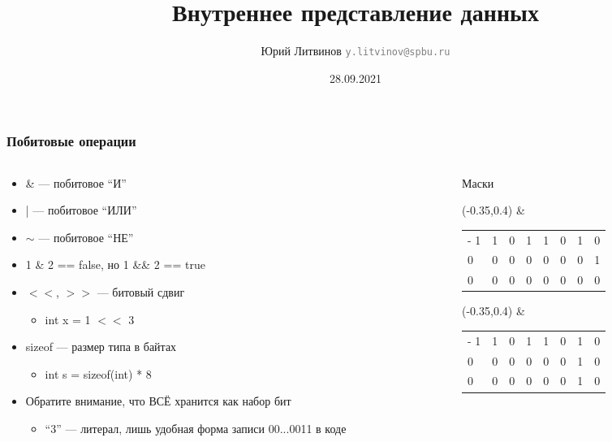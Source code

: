 \documentclass[xetex,mathserif,serif]{beamer}
\title{Внутреннее представление данных}
\author[Юрий Литвинов]{Юрий Литвинов \newline \textcolor{gray}{\small\texttt{y.litvinov@spbu.ru}}}
\date{28.09.2021}
\begin{document}
	
	\frame{\titlepage}
	
	\begin{frame}
		\frametitle{Побитовые операции}
		\begin{columns}
			\begin{column}{0.6\textwidth}
				\begin{itemize}
					\item \& --- побитовое ``И''
					\item | --- побитовое ``ИЛИ''
					\item $\sim$ --- побитовое ``НЕ''
					\item 1 \& 2 == false, но 1 \&\& 2 == true
					\item $<<$, $>>$ --- битовый сдвиг
					\begin{itemize}
						\item int x = 1 $<<$ 3
					\end{itemize}
					\item sizeof --- размер типа в байтах
					\begin{itemize}
						\item int s = sizeof(int) * 8
					\end{itemize}
					\item Обратите внимание, что ВСЁ хранится как набор бит
					\begin{itemize}
						\item ``3'' --- литерал, лишь удобная форма записи 00...0011 в коде
					\end{itemize}
				\end{itemize}
			\end{column}
			\begin{column}{0.4\textwidth}
				Маски
				\vspace{3mm}
				\begin{textblock}{1}(-0.35,0.4)
					\&
				\end{textblock}
				\begin{tabu} {| X[1 l p] | X[1 l p] | X[1 l p] | X[1 l p] | X[1 l p] | X[1 l p] | X[1 l p] | X[1 l p] |}
					\tabucline-
					\everyrow{\tabucline-}
					1 & 1 & 0 & 1 & 1 & 0 & 1 & 0 \\
					0 & 0 & 0 & 0 & 0 & 0 & 0 & 1 \\
					0 & 0 & 0 & 0 & 0 & 0 & 0 & 0 \\
				\end{tabu}
				\vspace{0.5cm}

				\begin{textblock}{1}(-0.35,0.4)
					\&
				\end{textblock}
				\begin{tabu} {| X[1 l p] | X[1 l p] | X[1 l p] | X[1 l p] | X[1 l p] | X[1 l p] | X[1 l p] | X[1 l p] |}
					\tabucline-
					\everyrow{\tabucline-}
					1 & 1 & 0 & 1 & 1 & 0 & 1 & 0 \\
					0 & 0 & 0 & 0 & 0 & 0 & 1 & 0 \\
					0 & 0 & 0 & 0 & 0 & 0 & 1 & 0 \\
				\end{tabu}
			\end{column}
		\end{columns}
	\end{frame}
\end{document}
